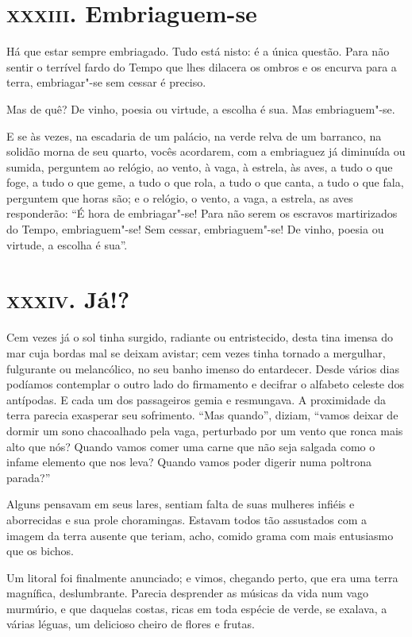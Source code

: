 \chapter{\textsc{xxxiii.} Embriaguem-se}

Há que estar sempre embriagado. Tudo está nisto: é a única questão. Para
não sentir o terrível fardo do Tempo que lhes dilacera os ombros e os
encurva para a terra, embriagar"-se sem cessar é preciso.

Mas de quê? De vinho, poesia ou virtude, a escolha é sua. Mas
embriaguem"-se.

E se às vezes, na escadaria de um palácio, na verde relva de um
barranco, na solidão morna de seu quarto, vocês acordarem, com a
embriaguez já diminuída ou sumida, perguntem ao relógio, ao vento, à
vaga, à estrela, às aves, a tudo o que foge, a tudo o que geme, a tudo o que
rola, a tudo o que canta, a tudo o que fala, perguntem que horas são; e
o relógio, o vento, a vaga, a estrela, as aves responderão:
“É hora de embriagar"-se! Para não serem os escravos
martirizados do Tempo, embriaguem"-se! Sem cessar, embriaguem"-se! De
vinho, poesia ou virtude, a escolha é sua''.

\chapter{\textsc{xxxiv.} Já!?}

Cem vezes já o sol tinha surgido, radiante ou entristecido, desta tina
imensa do mar cuja bordas mal se deixam avistar; cem vezes tinha
tornado a mergulhar, fulgurante ou melancólico, no seu banho imenso do
entardecer. Desde vários dias podíamos contemplar o outro lado do
firmamento e decifrar o alfabeto celeste dos antípodas. E cada um dos
passageiros gemia e resmungava. A proximidade da
terra parecia exasperar seu sofrimento. “Mas quando'',
 diziam, “vamos deixar de dormir
um sono chacoalhado pela vaga, perturbado por um vento que ronca mais
alto que nós? Quando vamos comer uma carne que não seja
salgada como o infame elemento que nos leva? Quando vamos poder
digerir numa poltrona parada?''

Alguns pensavam em seus lares, sentiam falta de suas mulheres
infiéis e aborrecidas e sua prole choramingas. Estavam todos tão
assustados com a imagem da terra ausente que teriam, acho, comido
grama com mais entusiasmo que os bichos.

Um litoral foi finalmente anunciado; e vimos, chegando perto, que era
uma terra magnífica, deslumbrante. Parecia desprender as músicas da vida
num vago murmúrio, e que daquelas costas, ricas em toda
espécie de verde, se exalava, a várias léguas, um delicioso cheiro de
flores e frutas.

